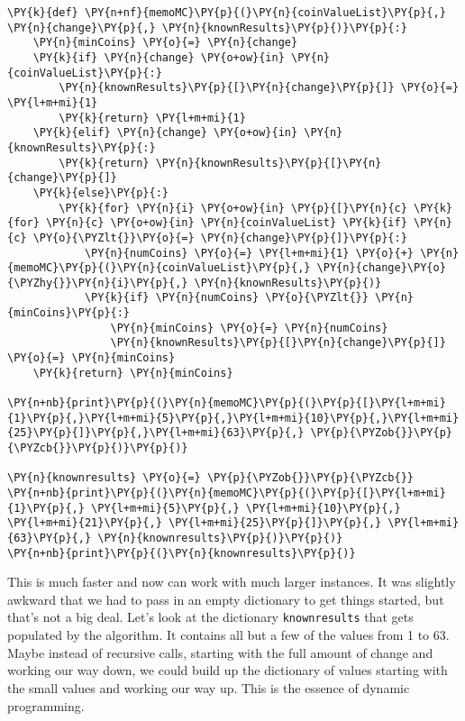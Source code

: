\begin{Verbatim}[commandchars=\\\{\}]
\PY{k}{def} \PY{n+nf}{memoMC}\PY{p}{(}\PY{n}{coinValueList}\PY{p}{,} \PY{n}{change}\PY{p}{,} \PY{n}{knownResults}\PY{p}{)}\PY{p}{:}
    \PY{n}{minCoins} \PY{o}{=} \PY{n}{change}
    \PY{k}{if} \PY{n}{change} \PY{o+ow}{in} \PY{n}{coinValueList}\PY{p}{:}
        \PY{n}{knownResults}\PY{p}{[}\PY{n}{change}\PY{p}{]} \PY{o}{=} \PY{l+m+mi}{1}
        \PY{k}{return} \PY{l+m+mi}{1}
    \PY{k}{elif} \PY{n}{change} \PY{o+ow}{in} \PY{n}{knownResults}\PY{p}{:}
        \PY{k}{return} \PY{n}{knownResults}\PY{p}{[}\PY{n}{change}\PY{p}{]}
    \PY{k}{else}\PY{p}{:}
        \PY{k}{for} \PY{n}{i} \PY{o+ow}{in} \PY{p}{[}\PY{n}{c} \PY{k}{for} \PY{n}{c} \PY{o+ow}{in} \PY{n}{coinValueList} \PY{k}{if} \PY{n}{c} \PY{o}{\PYZlt{}}\PY{o}{=} \PY{n}{change}\PY{p}{]}\PY{p}{:}
            \PY{n}{numCoins} \PY{o}{=} \PY{l+m+mi}{1} \PY{o}{+} \PY{n}{memoMC}\PY{p}{(}\PY{n}{coinValueList}\PY{p}{,} \PY{n}{change}\PY{o}{\PYZhy{}}\PY{n}{i}\PY{p}{,} \PY{n}{knownResults}\PY{p}{)}
            \PY{k}{if} \PY{n}{numCoins} \PY{o}{\PYZlt{}} \PY{n}{minCoins}\PY{p}{:}
                \PY{n}{minCoins} \PY{o}{=} \PY{n}{numCoins}
                \PY{n}{knownResults}\PY{p}{[}\PY{n}{change}\PY{p}{]} \PY{o}{=} \PY{n}{minCoins}
    \PY{k}{return} \PY{n}{minCoins}

\PY{n+nb}{print}\PY{p}{(}\PY{n}{memoMC}\PY{p}{(}\PY{p}{[}\PY{l+m+mi}{1}\PY{p}{,}\PY{l+m+mi}{5}\PY{p}{,}\PY{l+m+mi}{10}\PY{p}{,}\PY{l+m+mi}{25}\PY{p}{]}\PY{p}{,}\PY{l+m+mi}{63}\PY{p}{,} \PY{p}{\PYZob{}}\PY{p}{\PYZcb{}}\PY{p}{)}\PY{p}{)}

\PY{n}{knownresults} \PY{o}{=} \PY{p}{\PYZob{}}\PY{p}{\PYZcb{}}
\PY{n+nb}{print}\PY{p}{(}\PY{n}{memoMC}\PY{p}{(}\PY{p}{[}\PY{l+m+mi}{1}\PY{p}{,} \PY{l+m+mi}{5}\PY{p}{,} \PY{l+m+mi}{10}\PY{p}{,} \PY{l+m+mi}{21}\PY{p}{,} \PY{l+m+mi}{25}\PY{p}{]}\PY{p}{,} \PY{l+m+mi}{63}\PY{p}{,} \PY{n}{knownresults}\PY{p}{)}\PY{p}{)}
\PY{n+nb}{print}\PY{p}{(}\PY{n}{knownresults}\PY{p}{)}
\end{Verbatim}



This is much faster and now can work with much larger instances.
It was slightly awkward that we had to pass in an empty dictionary to get things started, but that's not a big deal.
Let's look at the dictionary \texttt{knownresults} that gets populated by the algorithm.
It contains all but a few of the values from 1 to 63.
Maybe instead of recursive calls, starting with the full amount of change and working our way down, we could build up the dictionary of values starting with the small values and working our way up.
This is the essence of dynamic programming.


